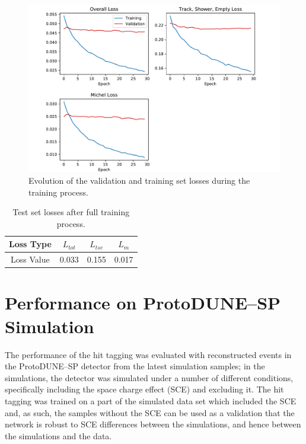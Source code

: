 \begin{figure}[h]
	\centering
	\includegraphics[width=\textwidth]{figures/losses_prelu.pdf}
	\caption[Validation and training set losses.]{Evolution of the validation
	and 
	training set losses during the training process.}
	\label{fig:training}
\end{figure}

\begin{table}[h]
	\centering
	\begin{tabular}{c|c|c|c}
		Loss Type   & \(L_{tot}\) & \(L_{tse}\) & \(L_m\) \\ \hline
		Loss Value  & 0.033       & 0.155       & 0.017   \\
	\end{tabular}
	\caption[Test set losses.]{Test set losses after full training process.}
	\label{tab:losses}
\end{table}

\section{Performance on ProtoDUNE--SP Simulation} \label{cnn-perf-sim}

The performance of the hit tagging was evaluated with reconstructed events in
the ProtoDUNE--SP detector from the latest simulation samples; in the
simulations, the detector was simulated under a number of different conditions,
specifically including the space charge effect (SCE) \cite{Mooney:2015kke} and
excluding it. The hit tagging was trained on a part of the simulated data set
which included the SCE and, as such, the samples without the SCE can be used as
a validation that the network is robust to SCE differences between the
simulations, and hence between the simulations and the data.

